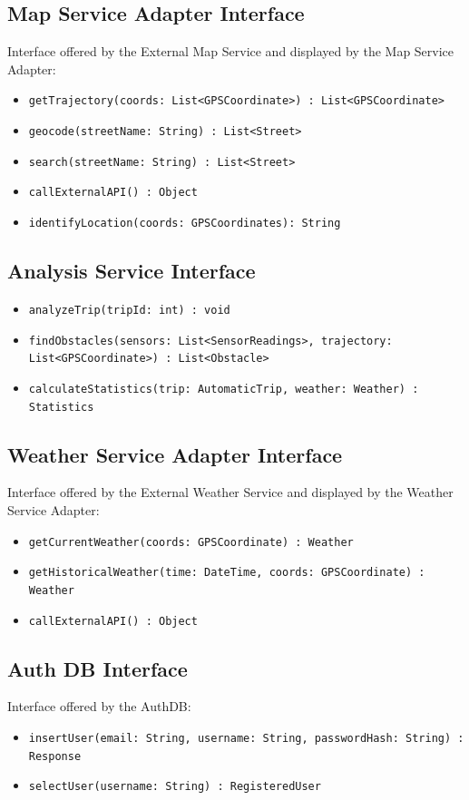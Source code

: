 \subsection{Map Service Adapter Interface}
Interface offered by the External Map Service and displayed by the Map Service Adapter:
\begin{itemize}
    \item \texttt{getTrajectory(coords: List<GPSCoordinate>) : List<GPSCoordinate>}
    \item \texttt{geocode(streetName: String) : List<Street>}
    \item \texttt{search(streetName: String) : List<Street>}
    \item \texttt{callExternalAPI() : Object}
    \item \texttt{identifyLocation(coords: GPSCoordinates): String}
\end{itemize}

\subsection{Analysis Service Interface}
\begin{itemize}
    \item \texttt{analyzeTrip(tripId: int) : void}
    \item \texttt{findObstacles(sensors: List<SensorReadings>, trajectory: List<GPSCoordinate>) : List<Obstacle>}
    \item \texttt{calculateStatistics(trip: AutomaticTrip, weather: Weather) : Statistics}
\end{itemize}

\subsection{Weather Service Adapter Interface}
Interface offered by the External Weather Service and displayed by the Weather Service Adapter:
\begin{itemize}
    \item \texttt{getCurrentWeather(coords: GPSCoordinate) : Weather}
    \item \texttt{getHistoricalWeather(time: DateTime, coords: GPSCoordinate) : Weather}
    \item \texttt{callExternalAPI() : Object}
\end{itemize}

\subsection{Auth DB Interface}
Interface offered by the AuthDB:
\begin{itemize}
    \item \texttt{insertUser(email: String, username: String, passwordHash: String) : Response}
    \item \texttt{selectUser(username: String) : RegisteredUser}
\end{itemize}

